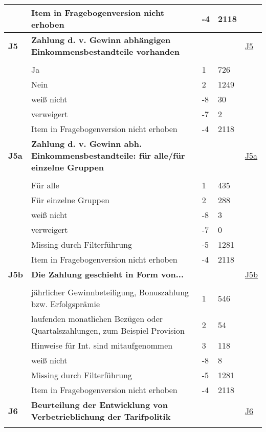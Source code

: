 \begin{longtable}{| L{2.5cm} | L{8.25cm}| C{1.5cm} | R{1.25cm} | C{2.25cm} |  }
   & Item in Fragebogenversion nicht erhoben & -4 & 2118 &  \\ 
   \midrule
\textbf{J5}\label{var:suf:J5} & \textbf{Zahlung d. v. Gewinn abhängigen Einkommensbestandteile vorhanden} &  &  & \hyperref[J5]{J5} \\ 
   &  &  &  &  \\ 
   & Ja & 1 & 726 &  \\ 
   & Nein & 2 & 1249 &  \\ 
   & weiß nicht & -8 & 30 &  \\ 
   & verweigert & -7 & 2 &  \\ 
   & Item in Fragebogenversion nicht erhoben & -4 & 2118 &  \\ 
   \midrule
\textbf{J5a}\label{var:suf:J5a} & \textbf{Zahlung d. v. Gewinn abh. Einkommensbestandteile: für alle/für einzelne Gruppen} &  &  & \hyperref[J5a]{J5a} \\ 
   &  &  &  &  \\ 
   & Für alle & 1 & 435 &  \\ 
   & Für einzelne Gruppen & 2 & 288 &  \\ 
   & weiß nicht & -8 & 3 &  \\ 
   & verweigert & -7 & 0 &  \\ 
   & Missing durch Filterführung & -5 & 1281 &  \\ 
   & Item in Fragebogenversion nicht erhoben & -4 & 2118 &  \\ 
   \midrule
\textbf{J5b}\label{var:suf:J5b} & \textbf{Die Zahlung geschieht in Form von...} &  &  & \hyperref[J5b]{J5b} \\ 
   &  &  &  &  \\ 
   & jährlicher Gewinnbeteiligung, Bonuszahlung bzw. Erfolgsprämie & 1 & 546 &  \\ 
   & laufenden monatlichen Bezügen oder Quartalszahlungen, zum Beispiel Provision & 2 & 54 &  \\ 
   & Hinweise für Int. sind mitaufgenommen & 3 & 118 &  \\ 
   & weiß nicht & -8 & 8 &  \\ 
   & Missing durch Filterführung & -5 & 1281 &  \\ 
   & Item in Fragebogenversion nicht erhoben & -4 & 2118 &  \\ 
   \midrule
\textbf{J6}\label{var:suf:J6} & \textbf{Beurteilung der Entwicklung von Verbetrieblichung der Tarifpolitik} &  &  & \hyperref[J6]{J6} \\ 
   &  &  &  &  \\ 

\end{longtable}
